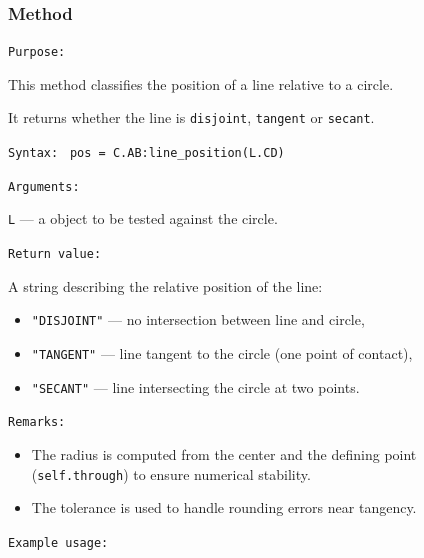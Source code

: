 \subsubsection{Method }
\label{ssub:method_circle_line_position}

\texttt{Purpose: }

This method classifies the position of a line relative to a circle.

It returns whether the line is \texttt{disjoint}, \texttt{tangent} or \texttt{secant}.

\medskip
\texttt{Syntax: } \verb|pos = C.AB:line_position(L.CD)|

\medskip
\texttt{Arguments: }

 \texttt{L} — a  object to be tested against the circle.

\medskip
\texttt{Return value: }

A string describing the relative position of the line:
\begin{itemize}
  \item \texttt{"DISJOINT"} — no intersection between line and circle,
  \item \texttt{"TANGENT"} — line tangent to the circle (one point of contact),
  \item \texttt{"SECANT"} — line intersecting the circle at two points.
\end{itemize}

\medskip
\texttt{Remarks: }

\begin{itemize}
  \item The radius is computed from the center and the defining point (\texttt{self.through})
        to ensure numerical stability.
  \item The tolerance  is used to handle rounding errors near tangency.
\end{itemize}

\medskip
\texttt{Example usage: }

\begin{tkzexample}[latex=.5\textwidth]
\end{tkzexample}

